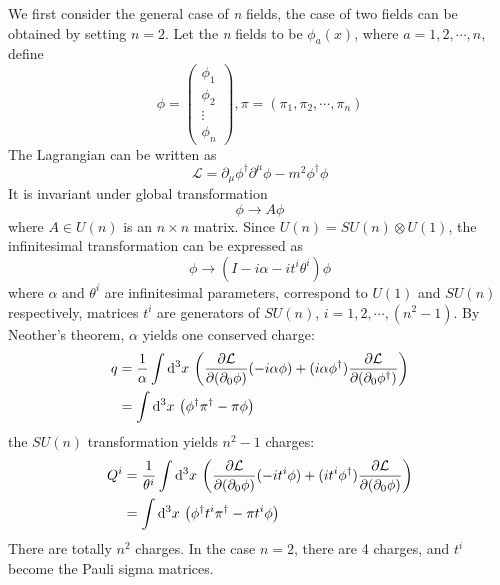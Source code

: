\begin{problembody}
    \item We first consider the general case of \textit{n} fields, the case of two fields can be obtained by setting $n = 2$. Let the \textit{n} fields to be 
    $\phi_a(x)$, where $a = 1, 2, \cdots, n$, define
    \begin{equation*}
        \phi = \begin{pmatrix}
            \phi_1\\
            \phi_2\\
            \vdots\\
            \phi_n
        \end{pmatrix},
        \pi = \left(\pi_1, \pi_2, \cdots, \pi_n\right)
    \end{equation*}
    The Lagrangian can be written as 
    \begin{equation}\label{equ:cp2:csf_nf_lag}
        \mathcal{L} = \partial_\mu \phi^\dagger \partial^\mu \phi - m^2 \phi^\dagger \phi
    \end{equation}
    It is invariant under global transformation
    \begin{equation*}
        \phi \to A \phi
    \end{equation*}
    where $A \in U(n)$ is an $n \times n$ matrix. Since $U(n) = SU(n) \otimes U(1)$, the infinitesimal transformation can be expressed as
    \begin{equation*}
        \phi \to (I - i\alpha - i t^i \theta^i)\phi
    \end{equation*}
    where $\alpha$ and $\theta^i$ are infinitesimal parameters, correspond to $U(1)$ and $SU(n)$ respectively, 
    matrices $t^i$ are generators of $SU(n)$, $i = 1, 2, \cdots, (n^2 - 1)$. By Neother's theorem, 
    $\alpha$ yields one conserved charge:
    \begin{align*}
        q & = \frac{1}{\alpha}\int \mathrm{d}^3x \, \left(\frac{\partial \mathcal{L}}{\partial (\partial_0\phi)}(-i\alpha\phi) + (i\alpha\phi^\dagger)\frac{\partial \mathcal{L}}{\partial (\partial_0\phi^\dagger)}\right)\\
        & = \int \mathrm{d}^3x \, \left(\phi^\dagger \pi^\dagger - \pi\phi\right)
    \end{align*}
    the $SU(n)$ transformation yields $n^2 - 1$ charges:
    \begin{align*}
        Q^i & = \frac{1}{\theta^i}\int \mathrm{d}^3x \, \left(\frac{\partial \mathcal{L}}{\partial (\partial_0\phi)} (-it^i\phi) + (it^i \phi^\dagger)\frac{\partial \mathcal{L}}{\partial (\partial_0\phi)} \right)\\
        & = \int \mathrm{d}^3x \, \left(\phi^\dagger t^i \pi^\dagger - \pi t^i \phi\right)
    \end{align*}
    There are totally $n^2$ charges. In the case $n = 2$, there are 4 charges, and $t^i$ become the Pauli sigma matrices.
\end{problembody}

